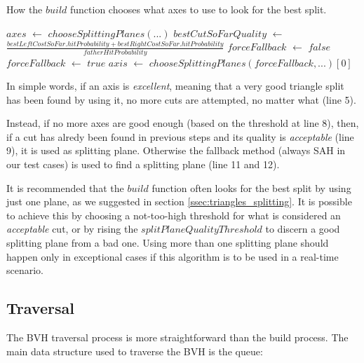 \documentclass{PoliMi_MasterThesis}
\newcommand*\Let[2]{\State #1 $\gets$ #2}
\begin{document}
\begin{algorithm}[H]
	\caption{How the $build$ function chooses what axes to use to look for the best split.}
	\begin{algorithmic}[1]
		\Let{$axes$}{$chooseSplittingPlanes(...)$}
			\Let{$bestCutSoFarQuality$}{$\frac{bestLeftCostSoFar.hitProbability + bestRightCostSoFar.hitProbability}{fatherHitProbability}$}
				\EndIf
				\Let{$forceFallback$}{$false$}
					\EndIf
				\EndIf
				\Let{$forceFallback$}{$true$}
				\Let{$axis$}{$chooseSplittingPlanes(forceFallback, ...)[0]$}
		\EndFor
	\end{algorithmic}
\end{algorithm} 

In simple words, if an axis is \textit{excellent}, meaning that a very good triangle split has been found by using it, no more cuts are attempted, no matter what (line 5).

Instead, if no more axes are good enough (based on the threshold at line 8), then, if a cut has alredy been found in previous steps and its quality is \textit{acceptable} (line 9), it is used as splitting plane. Otherwise the fallback method (always SAH in our test cases) is used to find a splitting plane (line 11 and 12).

It is recommended that the $build$ function often looks for the best split by using just one plane, as we suggested in section \ref{ssec:triangles_splitting}. It is possible to achieve this by choosing a not-too-high threshold for what is considered an \textit{acceptable} cut, or by rising the $splitPlaneQualityThreshold$ to discern a good splitting plane from a bad one. Using more than one splitting plane should happen only in exceptional cases if this algorithm is to be used in a real-time scenario.

\subsection{Traversal} \label{ssec:traversal}
The BVH traversal process is more straightforward than the build process. The main data structure used to traverse the BVH is the queue:
\end{document}
